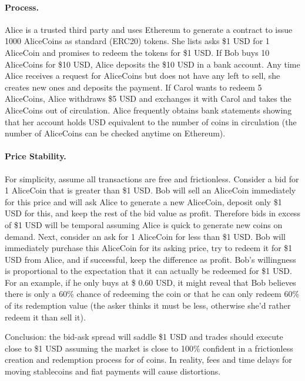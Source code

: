 \paragraph{Process.} Alice is a trusted third party and uses Ethereum to generate a contract to issue 1000 AliceCoins as standard (\eg ERC20) tokens. She lists asks \$1 USD for 1 AliceCoin and promises to redeem the tokens for \$1 USD. If Bob buys 10 AliceCoins for \$10 USD, Alice deposits the \$10 USD in a bank account. Any time Alice receives a request for AliceCoins but does not have any left to sell, she creates new ones and deposits the payment. If Carol wants to redeem 5 AliceCoins, Alice withdraws \$5 USD and exchanges it with Carol and takes the AliceCoins out of circulation. Alice frequently obtains bank statements showing that her account holds USD equivalent to the number of coins in circulation (the number of AliceCoins can be checked anytime on Ethereum).

\paragraph{Price Stability.} For simplicity, assume all transactions are free and frictionless. Consider a bid for 1 AliceCoin that is greater than \$1 USD. Bob will sell an AliceCoin immediately for this price and will ask Alice to generate a new AliceCoin, deposit only \$1 USD for this, and keep the rest of the bid value as profit. Therefore bids in excess of \$1 USD will be temporal assuming Alice is quick to generate new coins on demand. Next, consider an ask for 1 AliceCoin for less than \$1 USD. Bob will immediately purchase this AliceCoin for its asking price, try to redeem it for \$1 USD from Alice, and if successful, keep the difference as profit. Bob's willingness is proportional to the expectation that it can actually be redeemed for \$1 USD. For an example, if he only buys at \$ 0.60 USD, it might reveal that Bob believes there is only a 60\% chance of redeeming the coin or that he can only redeem 60\% of its redemption value (the asker thinks it must be less, otherwise she'd rather redeem it than sell it).

Conclusion: the bid-ask spread will saddle \$1 USD and trades should execute close to \$1 USD assuming the market is close to 100\% confident in a frictionless creation and redemption process for of coins. In reality, fees and time delays for moving stablecoins and fiat payments will cause distortions.


